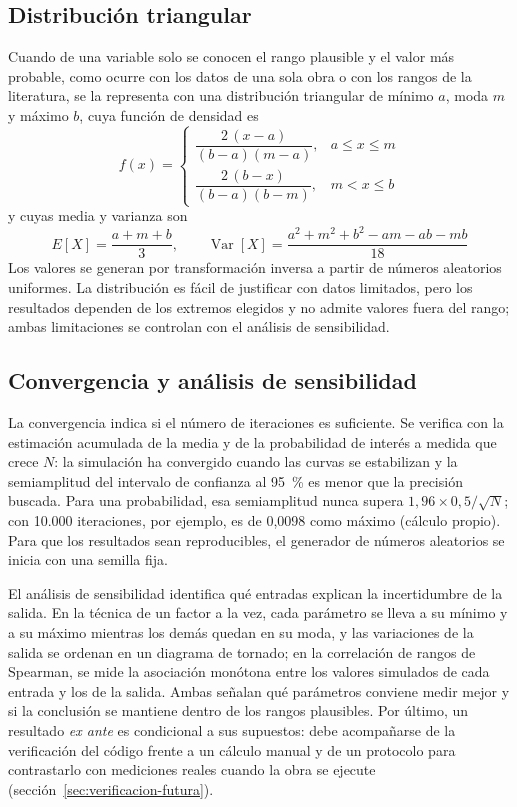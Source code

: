 \subsection{Distribución triangular}

Cuando de una variable solo se conocen el rango plausible y el valor más probable, como ocurre con los datos de una sola obra o con los rangos de la literatura, se la representa con una distribución triangular de mínimo $a$, moda $m$ y máximo $b$, cuya función de densidad es
\begin{equation}
  f(x) =
  \begin{cases}
    \dfrac{2\,(x-a)}{(b-a)(m-a)}, & a \leq x \leq m \\[8pt]
    \dfrac{2\,(b-x)}{(b-a)(b-m)}, & m < x \leq b
  \end{cases}
  \label{eq:triangular}
\end{equation}
y cuyas media y varianza son
\begin{equation}
  E[X] = \frac{a+m+b}{3}, \qquad
  \operatorname{Var}[X] = \frac{a^2+m^2+b^2-am-ab-mb}{18}
  \label{eq:triangular-momentos}
\end{equation}
Los valores se generan por transformación inversa a partir de números aleatorios uniformes. La distribución es fácil de justificar con datos limitados, pero los resultados dependen de los extremos elegidos y no admite valores fuera del rango; ambas limitaciones se controlan con el análisis de sensibilidad.

\subsection{Convergencia y análisis de sensibilidad}

La convergencia indica si el número de iteraciones es suficiente. Se verifica con la estimación acumulada de la media y de la probabilidad de interés a medida que crece $N$: la simulación ha convergido cuando las curvas se estabilizan y la semiamplitud del intervalo de confianza al 95~\% es menor que la precisión buscada. Para una probabilidad, esa semiamplitud nunca supera $1{,}96 \times 0{,}5/\sqrt{N}$; con 10.000 iteraciones, por ejemplo, es de 0,0098 como máximo (cálculo propio). Para que los resultados sean reproducibles, el generador de números aleatorios se inicia con una semilla fija.

El análisis de sensibilidad identifica qué entradas explican la incertidumbre de la salida. En la técnica de un factor a la vez, cada parámetro se lleva a su mínimo y a su máximo mientras los demás quedan en su moda, y las variaciones de la salida se ordenan en un diagrama de tornado; en la correlación de rangos de Spearman, se mide la asociación monótona entre los valores simulados de cada entrada y los de la salida. Ambas señalan qué parámetros conviene medir mejor y si la conclusión se mantiene dentro de los rangos plausibles. Por último, un resultado \emph{ex ante} es condicional a sus supuestos: debe acompañarse de la verificación del código frente a un cálculo manual y de un protocolo para contrastarlo con mediciones reales cuando la obra se ejecute (sección~\ref{sec:verificacion-futura}).

